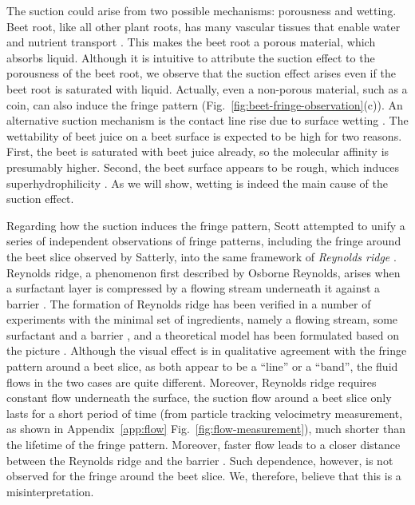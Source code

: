 \documentclass[aps,prfluids,amsmath,amssymb,superscriptaddress,longbibliography]{revtex4-2}
\begin{document}
The suction could arise from two possible mechanisms: porousness and wetting. 
Beet root, like all other plant roots, has many vascular tissues that enable water and nutrient transport \cite{Eshel2013}.
This makes the beet root a porous material, which absorbs liquid.
Although it is intuitive to attribute the suction effect to the porousness of the beet root, we observe that the suction effect arises even if the beet root is saturated with liquid. 
Actually, even a non-porous material, such as a coin, can also induce the fringe pattern (Fig.~\ref{fig:beet-fringe-observation}(c)).
An alternative suction mechanism is the contact line rise due to surface wetting \cite{deGennes1985,Bonn2009}.
The wettability of beet juice on a beet surface is expected to be high for two reasons. 
First, the beet is saturated with beet juice already, so the molecular affinity is presumably higher. 
Second, the beet surface appears to be rough, which induces superhydrophilicity \cite{Quere2008}.
As we will show, wetting is indeed the main cause of the suction effect. 

Regarding how the suction induces the fringe pattern, Scott attempted to unify a series of independent observations of fringe patterns, including the fringe around the beet slice observed by Satterly, into the same framework of \textit{Reynolds ridge} \cite{Scott1982}. 
Reynolds ridge, a phenomenon first described by Osborne Reynolds, arises when a surfactant layer is compressed by a flowing stream underneath it against a barrier \cite{reynolds1881}.  
The formation of Reynolds ridge has been verified in a number of experiments with the minimal set of ingredients, namely a flowing stream, some surfactant and a barrier \cite{Sellin1968, McCutchen1970, Scott1982}, and a theoretical model has been formulated based on the picture \cite{Harper1974}.
Although the visual effect is in qualitative agreement with the fringe pattern around a beet slice, as both appear to be a ``line'' or a ``band'', the fluid flows in the two cases are quite different. 
Moreover, Reynolds ridge requires constant flow underneath the surface, the suction flow around a beet slice only lasts for a short period of time (from particle tracking velocimetry measurement, as shown in Appendix~\ref{app:flow} Fig.~\ref{fig:flow-measurement}), much shorter than the lifetime of the fringe pattern. 
Moreover, faster flow leads to a closer distance between the Reynolds ridge and the barrier \cite{Mockros1968}. 
Such dependence, however, is not observed for the fringe around the beet slice.
We, therefore, believe that this is a misinterpretation.
\end{document}
